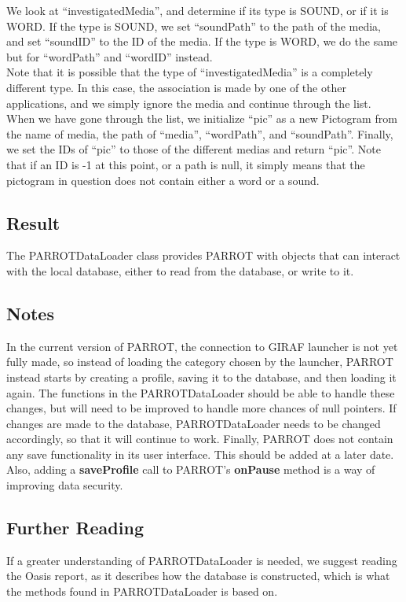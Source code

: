 We look at ``investigatedMedia'', and determine if its type is SOUND, or if it is WORD.
If the type is SOUND, we set ``soundPath'' to the path of the media, and set ``soundID'' to the ID of the media.
If the type is WORD, we do the same but for ``wordPath'' and ``wordID'' instead.\\
Note that it is possible that the type of ``investigatedMedia'' is a completely different type. In this case, the association is made by one of the other applications, and we simply ignore the media and continue through the list.\\
When we have gone through the list, we initialize ``pic'' as a new Pictogram from the name of media, the path of ``media'', ``wordPath'', and ``soundPath''.
Finally, we set the IDs of ``pic'' to those of the different medias and return ``pic''.\newline
Note that if an ID is -1 at this point, or a path is null, it simply means that the pictogram in question does not contain either a word or a sound.

\subsection*{Result}
The PARROTDataLoader class provides PARROT with objects that can interact with the local database, either to read from the database, or write to it.

\subsection*{Notes}
In the current version of PARROT, the connection to GIRAF launcher is not yet fully made, so instead of loading the category chosen by the launcher, PARROT instead starts by creating a profile, saving it to the database, and then loading it again.
The functions in the PARROTDataLoader should be able to handle these changes, but will need to be improved to handle more chances of null pointers.\newline
If changes are made to the database, PARROTDataLoader needs to be changed accordingly, so that it will continue to work.\newline
Finally, PARROT does not contain any save functionality in its user interface.
This should be added at a later date.
Also, adding a \textbf{saveProfile} call to PARROT's \textbf{onPause} method is a way of improving data security.

\subsection*{Further Reading}
If a greater understanding of PARROTDataLoader is needed, we suggest reading the Oasis report, as it describes how the database is constructed, which is what the methods found in PARROTDataLoader is based on.